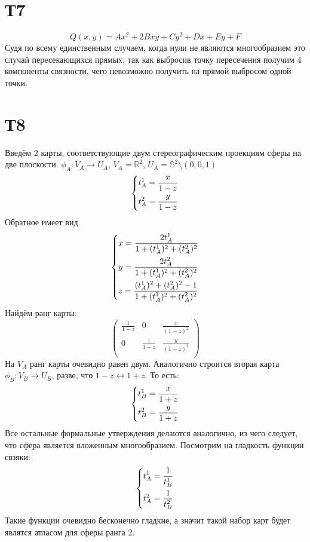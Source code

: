 \documentclass[12pt]{article}
\begin{document}
\section{Т7}
\[
    Q(x, y) = Ax^2 + 2Bxy + Cy^2 + Dx + Ey + F
\]
Судя по всему единственным случаем, когда нули не являются многообразием это случай пересекающихся прямых, 
так как выбросив точку пересечения получим 4 компоненты связности, чего невозможно получить на прямой выбросом одной точки.

\section{Т8}
Введём 2 карты, соответствующие двум стереографическим проекциям сферы на две плоскости. 
$\phi_A: V_A \to U_A$, $V_A = \mathbb{R}^2$, $U_A = \mathbb{S}^2 \setminus (0, 0, 1)$   
\[
    \begin{dcases}
        t_A^1 = \frac{x}{1 - z} \\
        t_A^2 = \frac{y}{1 - z}
    \end{dcases}
\]
Обратное имеет вид 
\[
    \begin{dcases}
        x = \frac{2t_A^1}{1 + (t_A^1)^2 + (t_A^2)^2} \\ 
        y = \frac{2t_A^2}{1 + (t_A^1)^2 + (t_A^2)^2} \\ 
        z = \frac{(t_A^1)^2 + (t_A^2)^2 - 1}{1 + (t_A^1)^2 + (t_A^2)^2}
    \end{dcases}
\]
Найдём ранг карты: 
\[
    \begin{pmatrix}
        \frac{1}{1 - z} & 0 & \frac{x}{(1-z)^2} \\ 
        0 & \frac{1}{1 - z} & \frac{y}{(1-z)^2} \\ 
    \end{pmatrix}
\]
На $V_A$ ранг карты очевидно равен двум.
Аналогично строится вторая карта $\phi_B: V_B \to U_B$, разве, что $1 - z \leftrightarrow 1 + z$. То есть: 
\[
    \begin{dcases}
        t_B^1 = \frac{x}{1 + z} \\
        t_B^2 = \frac{y}{1 + z}
    \end{dcases}
\]
Все остальные формальные утверждения делаются аналогично, из чего следует, что сфера 
является вложенным многообразием. 
Посмотрим на гладкость функции свзяки: 
\[
    \begin{dcases}
        t_A^1 = \frac{1}{t_B^1} \\
        t_A^2 = \frac{1}{t_B^2}
    \end{dcases}
\]
Такие функции очевидно бесконечно гладкие, а значит такой набор карт будет являтся 
атласом для сферы ранга 2.
\end{document}
